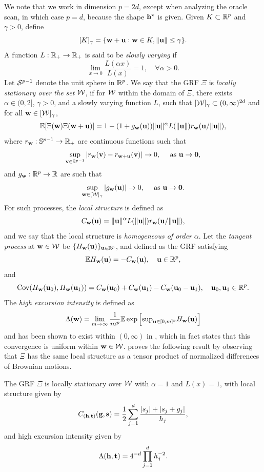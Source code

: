 \documentclass[twoside,11pt]{article}
\begin{document}
We note that we work in dimension $p = 2d$, except when analyzing the oracle scan, in which case $p=d$, because the shape $\mathbf{h}^\star$ is given.
Given $K \subset \mathbb{R}^p$ and $\gamma > 0$, define
\[
[K]_{\gamma} = \{ \mathbf{w} + \mathbf{u} : \mathbf{w} \in K, \| \mathbf{u} \| \le \gamma \}.
\]
A function $L: \mathbb{R}_+ \to \mathbb{R}_+$ is said to be {\em slowly varying} if 
\[
\lim_{x \rightarrow 0} \frac{L(\alpha x)}{L(x)} = 1, \quad \forall \alpha > 0.
\] 
Let ${\mathcal{S}}^{p-1}$ denote the unit sphere in $\mathbb{R}^p$.
We say that the GRF $\Xi$ is {\em locally stationary over the set $\mathcal{W}$}, if for $\mathcal{W}$ within the domain of $\Xi$, there exists $\alpha \in (0,2]$, $\gamma > 0$, and a slowly varying function $L$, 
such that $[\mathcal{W}]_\gamma \subset (0,\infty)^{2d}$ and for all $\mathbf{w} \in [\mathcal{W}]_{\gamma}$,
\begin{equation}
  \label{eq:local_stat}
  \mathbb{E} [\Xi(\mathbf{w}) \Xi(\mathbf{w} + \mathbf{u})] = 1 - (1 + g_{\mathbf{w}}(\mathbf{u})) \|\mathbf{u}\|^\alpha L(\|\mathbf{u}\|) r_{\mathbf{w}} (\mathbf{u} / \| \mathbf{u} \|),
\end{equation}
where $r_{\mathbf{w}}: \mathbb{S}^{p-1} \to \mathbb{R}_+$ are continuous functions such that 
\[
\sup_{\mathbf{v} \in \mathbb{S}^{p-1}} |r_{\mathbf{w}} (\mathbf{v}) - r_{\mathbf{w}+\mathbf{u}} (\mathbf{v})| \rightarrow 0, \quad \textrm{ as } \mathbf{u} \rightarrow {\bf 0},
\]
and $g_{\mathbf{w}}:\mathbb{R}^p \to \mathbb{R}$ are such that 
\[
\sup_{\mathbf{w} \in [\mathcal{W}]_{\gamma}} |g_{\mathbf{w}}(\mathbf{u})| \to 0,
\quad \textrm{ as } \mathbf{u} \rightarrow {\bf 0}.
\]
For such processes, the {\em local structure} is defined as
\[
C_{\mathbf{w}} (\mathbf{u}) = \|\mathbf{u}\|^\alpha L(\|\mathbf{u}\|) r_{\mathbf{w}} (\mathbf{u} / \| \mathbf{u} \|),
\]
and we say that the local structure is {\em homogeneous of order} $\alpha$.
Let the {\em tangent process} at $\mathbf{w} \in \mathcal{W}$ be $\{H_{\mathbf{w}}(\mathbf{u})\}_{\mathbf{u} \in \mathbb{R}^{p}}$, and defined as the GRF satisfying
\[\mathbb{E} H_{\mathbf{w}}(\mathbf{u}) = -C_{\mathbf{w}}(\mathbf{u}), \quad \mathbf{u} \in \mathbb{R}^p,\]
and
\[\operatorname*{Cov} (H_{\mathbf{w}}(\mathbf{u}_0), H_{\mathbf{w}}(\mathbf{u}_1)) = C_{\mathbf{w}}(\mathbf{u}_0) + C_{\mathbf{w}}(\mathbf{u}_1) - C_{\mathbf{w}}(\mathbf{u}_0 - \mathbf{u}_1), \quad \mathbf{u}_0, \mathbf{u}_1 \in \mathbb{R}^p.\] 
The {\em high excursion intensity} is defined as
\[
\Lambda(\mathbf{w}) = \lim_{m \rightarrow \infty} \frac1{m^p} \mathbb{E} \exp \Big[ {\textstyle\sup}_{\mathbf{u} \in [0,m]^p} H_{\mathbf{w}}(\mathbf{u}) \Big]
\]
and has been shown to exist within $(0,\infty)$ in \citep[Lem 5.2]{chan2006maxima}, which in fact states that this convergence is uniform within $\mathbf{w} \in \mathcal{W}$.
\cite{kabluchko2011extremes} proves the following result by observing that $\Xi$ has the same local structure as a tensor product of normalized differences of Brownian motions.

\begin{lemma}
\label{lem:excursion}
The GRF $\Xi$ is locally stationary over $\mathcal{W}$ with $\alpha = 1$ and $L(x) = 1$, with local structure given by
\[
C_{(\mathbf{h},\mathbf{t})} (\mathbf{g},\mathbf{s}) = \frac 12 \sum_{j=1}^d \frac{|s_j| + |s_j + g_j|}{h_j},
\]
and high excursion intensity given by 
\[
\Lambda(\mathbf{h},\mathbf{t}) = 4^{-d} \prod_{j = 1}^d h_j^{-2}.
\]
\end{lemma}
\end{document}
